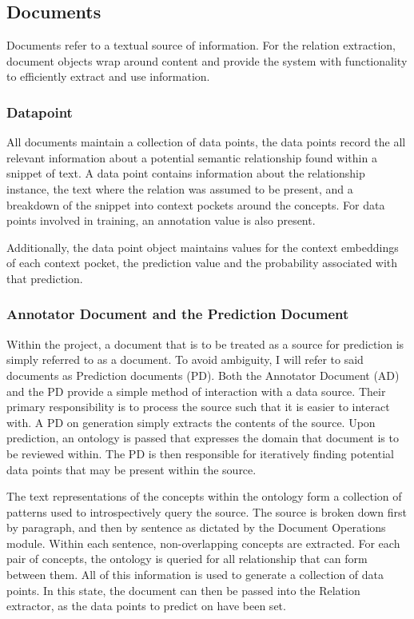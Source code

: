 \documentclass[11pt]{article} %
\begin{document}
\subsection{Documents}

Documents refer to a textual source of information. For the relation extraction, document objects wrap around content and provide the system with functionality to efficiently extract and use information.

\subsubsection{Datapoint}

All documents maintain a collection of data points, the data points record the all relevant information about a potential semantic relationship found within a snippet of text. A data point contains information about the relationship instance, the text where the relation was assumed to be present, and a breakdown of the snippet into context pockets around the concepts. For data points involved in training, an annotation value is also present.

Additionally, the data point object maintains values for the context embeddings of each context pocket, the prediction value and the probability associated with that prediction.

\subsubsection{Annotator Document and the Prediction Document}

Within the project, a document that is to be treated as a source for prediction is simply referred to as a document. To avoid ambiguity, I will refer to said documents as Prediction documents (PD). Both the Annotator Document (AD) and the PD provide a simple method of interaction with a data source. Their primary responsibility is to process the source such that it is easier to interact with. A PD on generation simply extracts the contents of the source. Upon prediction, an ontology is passed that expresses the domain that document is to be reviewed within. The PD is then responsible for iteratively finding potential data points that may be present within the source.

The text representations of the concepts within the ontology form a collection of patterns used to introspectively query the source. The source is broken down first by paragraph, and then by sentence as dictated by the Document Operations module. Within each sentence, non-overlapping concepts are extracted. For each pair of concepts, the ontology is queried for all relationship that can form between them. All of this information is used to generate a collection of data points. In this state, the document can then be passed into the Relation extractor, as the data points to predict on have been set.
\end{document}
